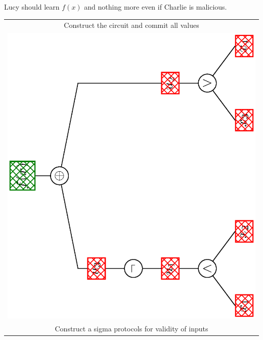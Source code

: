 \documentclass[landscape,footrule]{foils}
\begin{document}

\enlargethispage{1cm}

Lucy should learn $f(x)$ and nothing more even if Charlie is malicious.



\enlargethispage{1cm}

\begin{center}
\begin{tabular}{|c|}
 \hline
 Construct the circuit and commit all values\\
  \includegraphics[scale=0.18, angle=-90, clip, trim=3.5cm 0.0cm 3.5cm 0.0cm]{boolean-circuit}\\  
\hline
 Construct a sigma protocols for validity of inputs\\

\end{tabular}
\end{center}
\end{document}
